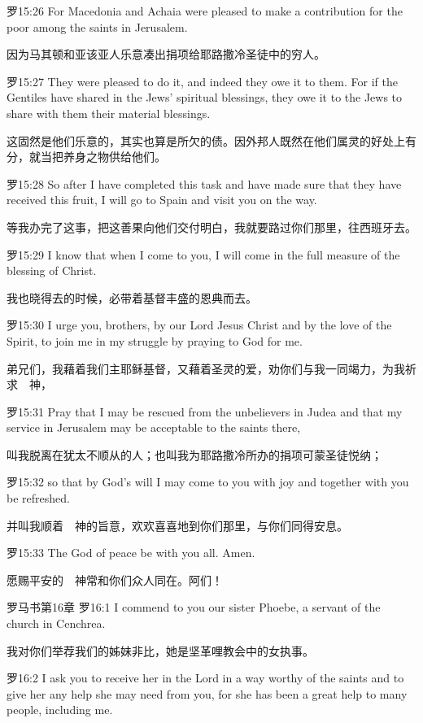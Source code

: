 \documentclass[a4paper,11pt,onecolumn,twoside]{ctexart}
\begin{document}
\begin{multicols}{2}
 罗15:26
 For Macedonia and Achaia were pleased to make a contribution for the poor among the saints in Jerusalem.

 因为马其顿和亚该亚人乐意凑出捐项给耶路撒冷圣徒中的穷人。


 罗15:27
 They were pleased to do it, and indeed they owe it to them. For if the Gentiles have shared in the Jews' spiritual blessings, they owe it to the Jews to share with them their material blessings.

 这固然是他们乐意的，其实也算是所欠的债。因外邦人既然在他们属灵的好处上有分，就当把养身之物供给他们。


 罗15:28
 So after I have completed this task and have made sure that they have received this fruit, I will go to Spain and visit you on the way.

 等我办完了这事，把这善果向他们交付明白，我就要路过你们那里，往西班牙去。


 罗15:29
 I know that when I come to you, I will come in the full measure of the blessing of Christ.

 我也晓得去的时候，必带着基督丰盛的恩典而去。


 罗15:30
 I urge you, brothers, by our Lord Jesus Christ and by the love of the Spirit, to join me in my struggle by praying to God for me.

 弟兄们，我藉着我们主耶稣基督，又藉着圣灵的爱，劝你们与我一同竭力，为我祈求　神，


 罗15:31
 Pray that I may be rescued from the unbelievers in Judea and that my service in Jerusalem may be acceptable to the saints there,

 叫我脱离在犹太不顺从的人；也叫我为耶路撒冷所办的捐项可蒙圣徒悦纳；


 罗15:32
 so that by God's will I may come to you with joy and together with you be refreshed.

 并叫我顺着　神的旨意，欢欢喜喜地到你们那里，与你们同得安息。


 罗15:33
 The God of peace be with you all. Amen.

 愿赐平安的　神常和你们众人同在。阿们！


 罗马书第16章
 罗16:1
 I commend to you our sister Phoebe, a servant of the church in Cenchrea.

 我对你们举荐我们的姊妹非比，她是坚革哩教会中的女执事。


 罗16:2
 I ask you to receive her in the Lord in a way worthy of the saints and to give her any help she may need from you, for she has been a great help to many people, including me.


\end{multicols}
\end{document}
